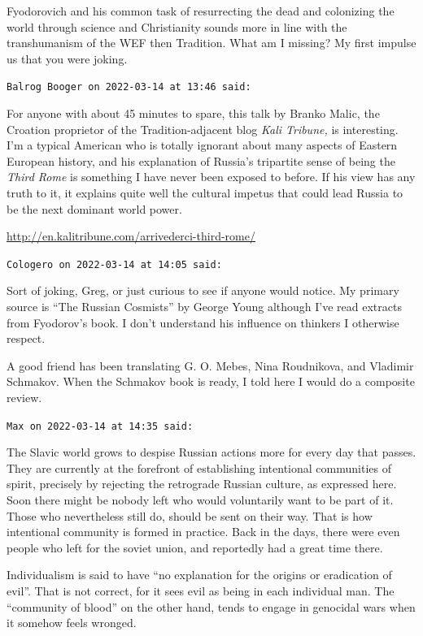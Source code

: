 \begin{footnotesize}
\begin{sffamily}
Fyodorovich and his common task of resurrecting the dead and colonizing the world through science and Christianity sounds more in line with the transhumanism of the WEF then Tradition. What am I missing? My first impulse us that you were joking.

\hfill

\texttt{Balrog Booger on 2022-03-14 at 13:46 said:}

For anyone with about 45 minutes to spare, this talk by Branko Malic, the Croation proprietor of the Tradition-adjacent blog \emph{Kali Tribune,} is interesting. I'm a typical American who is totally ignorant about many aspects of Eastern European history, and his explanation of Russia's tripartite sense of being the \emph{Third Rome} is something I have never been exposed to before. If his view has any truth to it, it explains quite well the cultural impetus that could lead Russia to be the next dominant world power.

\url{http://en.kalitribune.com/arrivederci-third-rome/}


\hfill

\texttt{Cologero on 2022-03-14 at 14:05 said:}

Sort of joking, Greg, or just curious to see if anyone would notice. My primary source is ``The Russian Cosmists'' by George Young although I've read extracts from Fyodorov's book. I don't understand his influence on thinkers I otherwise respect.

A good friend has been translating G. O. Mebes, Nina Roudnikova, and Vladimir Schmakov. When the Schmakov book is ready, I told here I would do a composite review.

\hfill

\texttt{Max on 2022-03-14 at 14:35 said:}

The Slavic world grows to despise Russian actions more for every day that passes. They are currently at the forefront of establishing intentional communities of spirit, precisely by rejecting the retrograde Russian culture, as expressed here. Soon there might be nobody left who would voluntarily want to be part of it. Those who nevertheless still do, should be sent on their way. That is how intentional community is formed in practice. Back in the days, there were even people who left for the soviet union, and reportedly had a great time there.

Individualism is said to have ``no explanation for the origins or eradication of evil''. That is not correct, for it sees evil as being in each individual man. The ``community of blood'' on the other hand, tends to engage in genocidal wars when it somehow feels wronged.


\end{sffamily}
\end{footnotesize}
